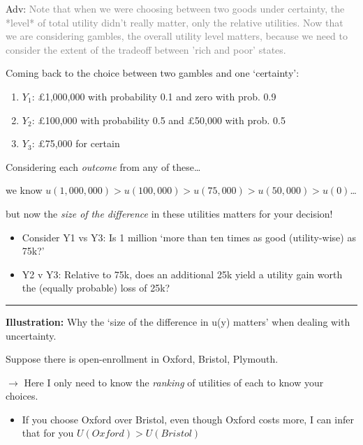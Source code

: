 \documentclass[]{article}
\providecommand{\tightlist}{%
  \setlength{\itemsep}{0pt}\setlength{\parskip}{0pt}}
\begin{document}
\bigskip

\textcolor{RawSienna}{Adv:}
\textcolor{gray}{Note that when we were choosing between two goods under certainty,
the *level* of total utility didn't really matter, only the relative utilities. Now that we are considering gambles, the overall utility level matters, because we need to consider the extent of the tradeoff between 'rich and poor' states.}

\bigskip

Coming back to the choice between two gambles and one `certainty':

\begin{enumerate}
\def\labelenumi{\arabic{enumi}.}
\tightlist
\item
  \(Y_1\): \pounds1,000,000 with probability 0.1 and zero with prob. 0.9
\item
  \(Y_2\): \pounds100,000 with probability 0.5 and \pounds50,000 with
  prob. 0.5
\item
  \(Y_3\): \pounds75,000 for certain
\end{enumerate}

Considering each \emph{outcome} from any of these\ldots{}

we know
\(u(1,000,000) > u(100,000) > u(75,000)> u(50,000) > u(0)\)\ldots{}

but now the \emph{size of the difference} in these utilities matters for
your decision!

\bigskip

\begin{itemize}
\item
  Consider Y1 vs Y3: Is 1 million `more than ten times as good
  (utility-wise) as 75k?'
\item
  Y2 v Y3: Relative to 75k, does an additional 25k yield a utility gain
  worth the (equally probable) loss of 25k?
\end{itemize}

\begin{center}\rule{0.5\linewidth}{\linethickness}\end{center}

\textbf{Illustration:} Why the `size of the difference in u(y) matters'
when dealing with uncertainty.

Suppose there is open-enrollment in Oxford, Bristol, Plymouth.

\(\rightarrow\) Here I only need to know the \emph{ranking} of utilities
of each to know your choices.

\begin{itemize}
\tightlist
\item
  If you choose Oxford over Bristol, even though Oxford costs more, I
  can infer that for you \(U(Oxford)>U(Bristol)\)
\end{itemize}
\end{document}
